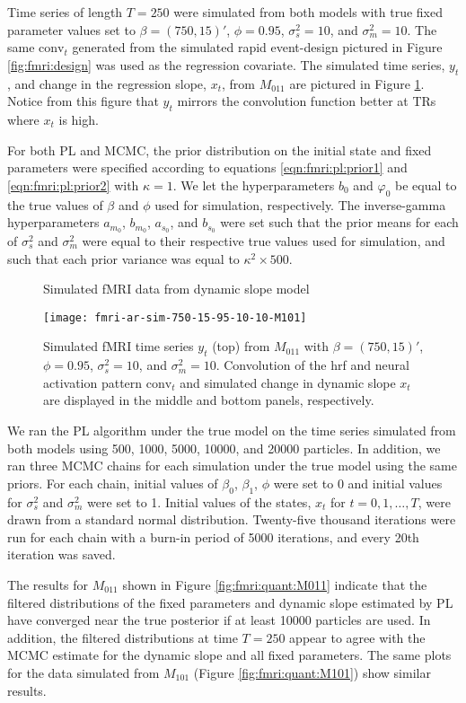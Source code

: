Time series of length $T = 250$ were simulated from both models with true fixed parameter values set to $\beta = (750,15)'$, $\phi = 0.95$, $\sigma^2_s = 10$, and $\sigma^2_m = 10$. The same $\mbox{conv}_t$ generated from the simulated rapid event-design pictured in Figure \ref{fig:fmri:design} was used as the regression covariate. The simulated time series, $y_t$, and change in the regression slope, $x_t$, from $M_{011}$ are pictured in Figure \ref{fig:fmri:sim}. Notice from this figure that $y_t$ mirrors the convolution function better at TRs where $x_t$ is high.

For both PL and MCMC, the prior distribution on the initial state and fixed parameters were specified according to equations \eqref{eqn:fmri:pl:prior1} and \eqref{eqn:fmri:pl:prior2} with $\kappa = 1$. We let the hyperparameters $b_0$ and $\varphi_0$ be equal to the true values of $\beta$ and $\phi$ used for simulation, respectively. The inverse-gamma hyperparameters $a_{m_0}$, $b_{m_0}$, $a_{s_0}$, and $b_{s_0}$ were set such that the prior means for each of $\sigma^2_s$ and $\sigma^2_m$ were equal to their respective true values used for simulation, and such that each prior variance was equal to $\kappa^2\times500$.

\begin{figure}
\ssp
\centering
\caption{Simulated fMRI data from dynamic slope model} \label{fig:fmri:sim}
\texttt{[image: fmri-ar-sim-750-15-95-10-10-M101]}
\caption*{Simulated fMRI time series $y_t$ (top) from $M_{011}$ with $\beta = (750,15)'$, $\phi = 0.95$, $\sigma^2_s = 10$, and $\sigma^2_m = 10$. Convolution of the hrf and neural activation pattern $\mbox{conv}_t$ and simulated change in dynamic slope $x_t$ are displayed in the middle and bottom panels, respectively.}
\end{figure}

We ran the PL algorithm under the true model on the time series simulated from both models using 500, 1000, 5000, 10000, and 20000 particles. In addition, we ran three MCMC chains for each simulation under the true model using the same priors. For each chain, initial values of $\beta_0$, $\beta_1$, $\phi$ were set to 0 and initial values for $\sigma^2_s$ and $\sigma^2_m$ were set to 1. Initial values of the states, $x_t$ for $t = 0,1,\ldots,T$, were drawn from a standard normal distribution. Twenty-five thousand iterations were run for each chain with a burn-in period of 5000 iterations, and every 20th iteration was saved.

The results for $M_{011}$ shown in Figure \ref{fig:fmri:quant:M011} indicate that the filtered distributions of the fixed parameters and dynamic slope estimated by PL have converged near the true posterior if at least 10000 particles are used. In addition, the filtered distributions at time $T = 250$ appear to agree with the MCMC estimate for the dynamic slope and all fixed parameters. The same plots for the data simulated from $M_{101}$ (Figure \ref{fig:fmri:quant:M101}) show similar results.

